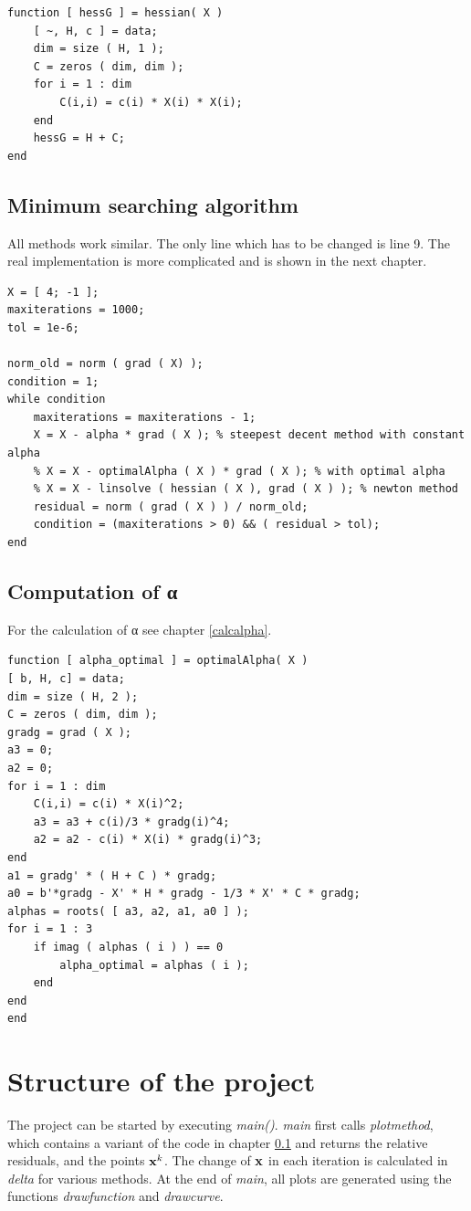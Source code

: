 \documentclass[a4paper,12pt]{article}
\newcommand{\code}[1]{\textit{#1}}
\begin{document}
\begin{lstlisting}
function [ hessG ] = hessian( X )
	[ ~, H, c ] = data;
	dim = size ( H, 1 );
	C = zeros ( dim, dim );
	for i = 1 : dim
		C(i,i) = c(i) * X(i) * X(i);
	end
	hessG = H + C;
end
\end{lstlisting}

\subsection{Minimum searching algorithm}\label{core}
All methods work similar. 
The only line which has to be changed is line 9.
The real implementation is more complicated and is shown in the next chapter.
\begin{lstlisting}
X = [ 4; -1 ];
maxiterations = 1000;
tol = 1e-6;

norm_old = norm ( grad ( X) );
condition = 1;
while condition
	maxiterations = maxiterations - 1;
	X = X - alpha * grad ( X ); % steepest decent method with constant alpha
	% X = X - optimalAlpha ( X ) * grad ( X ); % with optimal alpha
	% X = X - linsolve ( hessian ( X ), grad ( X ) ); % newton method
	residual = norm ( grad ( X ) ) / norm_old;
	condition = (maxiterations > 0) && ( residual > tol);
end
\end{lstlisting}

\subsection{Computation of α}
For the calculation of α see chapter \ref{calcalpha}.
\begin{lstlisting}
function [ alpha_optimal ] = optimalAlpha( X )
[ b, H, c] = data;
dim = size ( H, 2 );
C = zeros ( dim, dim );
gradg = grad ( X );
a3 = 0;
a2 = 0;
for i = 1 : dim
	C(i,i) = c(i) * X(i)^2;
	a3 = a3 + c(i)/3 * gradg(i)^4;
	a2 = a2 - c(i) * X(i) * gradg(i)^3;
end
a1 = gradg' * ( H + C ) * gradg;
a0 = b'*gradg - X' * H * gradg - 1/3 * X' * C * gradg;
alphas = roots( [ a3, a2, a1, a0 ] );
for i = 1 : 3
	if imag ( alphas ( i ) ) == 0
		alpha_optimal = alphas ( i );
	end
end
end
\end{lstlisting}
 
\section{Structure of the project}
The project can be started by executing \code{main()}. 
\code{main} first calls \code{plotmethod}, which contains a variant of the code in chapter \ref{core} and returns the relative residuals, and the points ${\bf x}^{k}$.
The change of $\bf x$ in each iteration is calculated in \code{delta} for various methods.
At the end of \code{main}, all plots are generated using the functions \code{drawfunction} and \code{drawcurve}.
\end{document}
